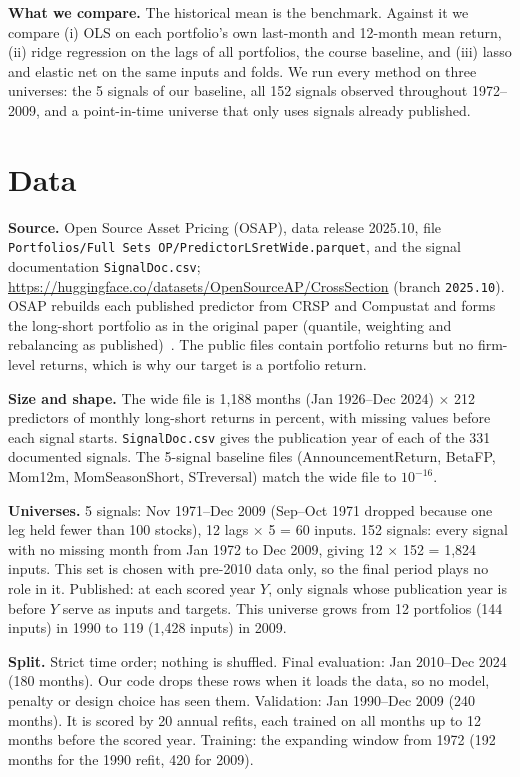 \documentclass{article}
\begin{document}
\textbf{What we compare.} The historical mean is the benchmark. Against it we compare (i) OLS on each portfolio's own last-month and 12-month mean return, (ii) ridge regression on the lags of all portfolios, the course baseline, and (iii) lasso and elastic net on the same inputs and folds. We run every method on three universes: the 5 signals of our baseline, all 152 signals observed throughout 1972--2009, and a point-in-time universe that only uses signals already published.

\section{Data}
\textbf{Source.} Open Source Asset Pricing (OSAP), data release 2025.10, file \texttt{Portfolios/Full Sets OP/PredictorLSretWide.parquet}, and the signal documentation \texttt{SignalDoc.csv}; \url{https://huggingface.co/datasets/OpenSourceAP/CrossSection} (branch \texttt{2025.10}). OSAP rebuilds each published predictor from CRSP and Compustat and forms the long-short portfolio as in the original paper (quantile, weighting and rebalancing as published)~\cite{chen2022}. The public files contain portfolio returns but no firm-level returns, which is why our target is a portfolio return.

\textbf{Size and shape.} The wide file is 1{,}188 months (Jan 1926--Dec 2024) $\times$ 212 predictors of monthly long-short returns in percent, with missing values before each signal starts. \texttt{SignalDoc.csv} gives the publication year of each of the 331 documented signals. The 5-signal baseline files (AnnouncementReturn, BetaFP, Mom12m, MomSeasonShort, STreversal) match the wide file to $10^{-16}$.

\textbf{Universes.} 5 signals: Nov 1971--Dec 2009 (Sep--Oct 1971 dropped because one leg held fewer than 100 stocks), 12 lags $\times$ 5 = 60 inputs. 152 signals: every signal with no missing month from Jan 1972 to Dec 2009, giving 12 $\times$ 152 = 1{,}824 inputs. This set is chosen with pre-2010 data only, so the final period plays no role in it. Published: at each scored year $Y$, only signals whose publication year is before $Y$ serve as inputs and targets. This universe grows from 12 portfolios (144 inputs) in 1990 to 119 (1{,}428 inputs) in 2009.

\textbf{Split.} Strict time order; nothing is shuffled. Final evaluation: Jan 2010--Dec 2024 (180 months). Our code drops these rows when it loads the data, so no model, penalty or design choice has seen them. Validation: Jan 1990--Dec 2009 (240 months). It is scored by 20 annual refits, each trained on all months up to 12 months before the scored year. Training: the expanding window from 1972 (192 months for the 1990 refit, 420 for 2009).
\end{document}
